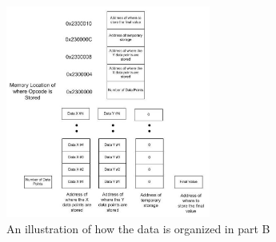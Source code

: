 \documentclass[letterpaper]{article}
\begin{document}
    \begin{figure}[h!]
      \centering
      \includegraphics[width=0.6\textwidth]{memb.jpg}
      \caption{An illustration of how the data is organized in part B}
    \end{figure}
\end{document}
